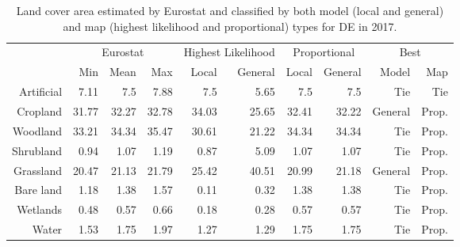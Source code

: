     \begin{table}[H]
    \centering
    \caption{Land cover area estimated by Eurostat and classified by both model (local and general) and map (highest likelihood and proportional) types for DE in 2017.}
    
    \begin{tabular}{r|rrr|rr|rr|rr}
    \toprule
    {} & \multicolumn{3}{|c}{Eurostat} & \multicolumn{2}{|c}{Highest Likelihood} & \multicolumn{2}{|c}{Proportional} & \multicolumn{2}{|c}{Best} \\
    {} &      Min &   Mean &    Max &              Local & General &        Local & General &    Model &    Map \\
    \midrule
    Artificial &     7.11 &    7.5 &   7.88 &                7.5 &    5.65 &          7.5 &     7.5 &      Tie &    Tie \\
    Cropland   &    31.77 &  32.27 &  32.78 &              34.03 &   25.65 &        32.41 &   32.22 &  General &  Prop. \\
    Woodland   &    33.21 &  34.34 &  35.47 &              30.61 &   21.22 &        34.34 &   34.34 &      Tie &  Prop. \\
    Shrubland  &     0.94 &   1.07 &   1.19 &               0.87 &    5.09 &         1.07 &    1.07 &      Tie &  Prop. \\
    Grassland  &    20.47 &  21.13 &  21.79 &              25.42 &   40.51 &        20.99 &   21.18 &  General &  Prop. \\
    Bare land  &     1.18 &   1.38 &   1.57 &               0.11 &    0.32 &         1.38 &    1.38 &      Tie &  Prop. \\
    Wetlands   &     0.48 &   0.57 &   0.66 &               0.18 &    0.28 &         0.57 &    0.57 &      Tie &  Prop. \\
    Water      &     1.53 &   1.75 &   1.97 &               1.27 &    1.29 &         1.75 &    1.75 &      Tie &  Prop. \\
    \bottomrule
    \end{tabular}
    \end{table}
    
